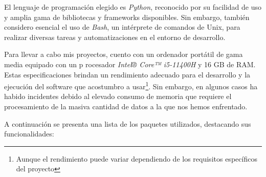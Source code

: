 El lenguaje de programación elegido es \textit{Python}, reconocido por su facilidad de uso y amplia 
gama de bibliotecas y frameworks disponibles. Sin embargo, también considero esencial el uso de \textit{Bash}, 
un intérprete de comandos de Unix, para realizar diversas tareas y automatizaciones en el entorno 
de desarrollo.

Para llevar a cabo mis proyectos, cuento con un ordenador portátil de gama media equipado con un p
rocesador \textit{Intel® Core™ i5-11400H} y 16 GB de RAM. Estas especificaciones brindan un rendimiento 
adecuado para el desarrollo y la ejecución del software que acostumbro a usar\footnote{ Aunque el 
rendimiento puede variar dependiendo de los requisitos específicos del proyecto}. Sin embargo, en 
algunos casos ha habido incidentes debido al elevado consumo de memoria que requiere el procesamiento 
de la masiva cantidad de datos a la que nos hemos enfrentado.

A continuación se presenta una lista de los paquetes utilizados, destacando sus funcionalidades:

